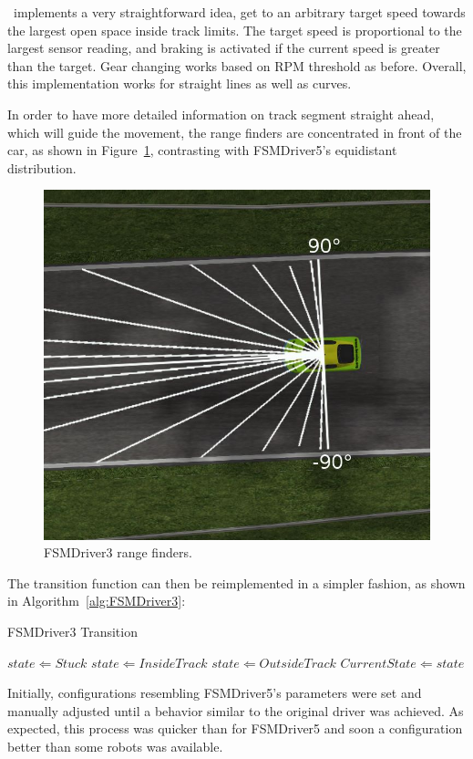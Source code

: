 \IT~implements a very straightforward idea, get to an arbitrary target speed towards the largest open space inside track limits. The target speed is proportional to the largest sensor reading, and braking is activated if the current speed is greater than the target. Gear changing works based on RPM threshold as before. Overall, this implementation works for straight lines as well as curves.

In order to have more detailed information on track segment straight ahead, which will guide the movement, the range finders are concentrated in front of the car, as shown in Figure~\ref{Fig:FSM3Sensors}, contrasting with FSMDriver5's equidistant distribution.

\begin{figure}[h]
	\centering
	\includegraphics[width=.45\textwidth]{img/FSM3Sensors}
	\caption{FSMDriver3 range finders.}
	\label{Fig:FSM3Sensors}
\end{figure}

The transition function can then be reimplemented in a simpler fashion, as shown in Algorithm~\ref{alg:FSMDriver3}:

\begin{algorithm}[h]%
\caption{FSMDriver3 Transition}%
\label{alg:FSMDriver3}%
\begin{algorithmic}
        \STATE $state \Leftarrow Stuck$
    \ELSE
            \STATE $state \Leftarrow Inside Track$
        \ELSE
            \STATE $state \Leftarrow Outside Track$
        \ENDIF
    \ENDIF
        \STATE $Current State \Leftarrow state$
    \ENDIF
\end{algorithmic}
\end{algorithm}

Initially, configurations resembling FSMDriver5's parameters were set and manually adjusted until a behavior similar to the original driver was achieved. As expected, this process was quicker than for FSMDriver5 and soon a configuration better than some robots was available.

